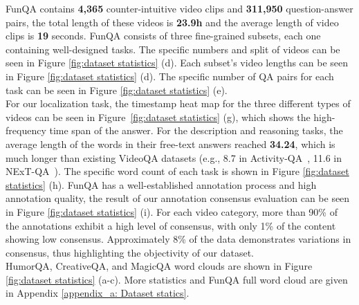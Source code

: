 FunQA contains \textbf{4,365} counter-intuitive video clips and \textbf{311,950} question-answer pairs, the total length of these videos is \textbf{23.9h} and the average length of video clips is \textbf{19} seconds. FunQA consists of three fine-grained subsets, each one containing well-designed tasks. The specific numbers and split of videos can be seen in Figure \ref{fig:dataset statistics} (d). Each subset's video lengths can be seen in Figure \ref{fig:dataset statistics} (d). The specific number of QA pairs for each task can be seen in Figure \ref{fig:dataset statistics} (e). \\
For our localization task, the timestamp heat map for the three different types of videos can be seen in Figure~\ref{fig:dataset statistics} (g), which shows the high-frequency time span of the answer. For the description and reasoning tasks, the average length of the words in their free-text answers reached \textbf{34.24}, which is much longer than existing VideoQA datasets (e.g., 8.7 in Activity-QA~\cite{yu2019activitynet}, 11.6 in NExT-QA~\cite{xiao2021nextqanext}). The specific word count of each task is shown in Figure \ref{fig:dataset statistics} (h). FunQA has a well-established annotation process and high annotation quality, the result of our annotation consensus evaluation can be seen in Figure \ref{fig:dataset statistics} (i). For each video category, more than 90\% of the annotations exhibit a high level of consensus, with only 1\% of the content showing low consensus. Approximately 8\% of the data demonstrates variations in consensus, thus highlighting the objectivity of our dataset. \\
HumorQA, CreativeQA, and MagicQA word clouds are shown in Figure \ref{fig:dataset statistics} (a-c). More statistics and FunQA full word cloud are given in Appendix \ref{appendix_a: Dataset statics}.

  
